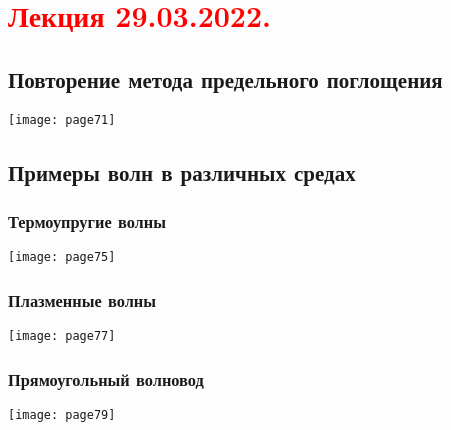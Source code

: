\documentclass[main.tex]{subfiles}
\begin{document}
\section{\textcolor{red}{Лекция 29.03.2022.}}

\subsection{Повторение метода предельного поглощения}
\texttt{[image: page71]}




\subsection{Примеры волн в различных средах}
\subsubsection{Термоупругие волны}
\texttt{[image: page75]}


\subsubsection{Плазменные волны}
\texttt{[image: page77]}


\subsubsection{Прямоугольный волновод}
\texttt{[image: page79]}


\end{document}
